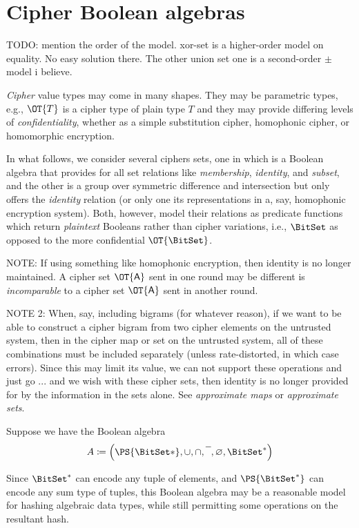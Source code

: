\documentclass[ ../main.tex]{subfiles}
\begin{document}
\section{Cipher Boolean algebras}
TODO: mention the order of the model. xor-set is a higher-order model on equality. No easy solution there.
The other union set one is a second-order $\pm$ model i believe.

\emph{Cipher} value types may come in many shapes.
They may be parametric types, e.g., $\OT{T}$ is a cipher type of plain type $T$ and they may provide differing levels of \emph{confidentiality}, whether as a simple substitution cipher, homophonic cipher, or homomorphic encryption.

In what follows, we consider several ciphers sets, one in which is a Boolean algebra that provides for all set relations like \emph{membership}, \emph{identity}, and \emph{subset}, and the other is a group over symmetric difference and intersection but only offers the \emph{identity} relation (or only one its representations in a, say, homophonic encryption system).
Both, however, model their relations as predicate functions which return \emph{plaintext} Booleans rather than cipher variations, i.e., $\BitSet$ as opposed to the more confidential $\OT{\BitSet}$.

NOTE: If using something like homophonic encryption, then identity is no longer maintained. A cipher set $\OT{\Set{A}}$ sent in one round may be different is \emph{incomparable} to a cipher set $\OT{\Set{A}}$ sent in another round. 

NOTE 2: When, say, including bigrams (for whatever reason), if we want to be able to construct a cipher bigram from two cipher elements on the untrusted system, then in the cipher map or set on the untrusted system, all of these combinations must be included separately (unless rate-distorted, in which case errors). Since this may limit its value, we can not support these operations and just go 
...
and we wish  with these cipher sets, then identity is no longer provided for by the information in the sets alone. See \emph{approximate maps} or \emph{approximate sets}.




Suppose we have the Boolean algebra
\begin{equation}
	A \coloneqq \left(\PS{\BitSet*}, \SetUnion, \SetIntersection, \SetComplement, \EmptySet, {\BitSet^*}\right)
\end{equation}

Since $\BitSet^*$ can encode any tuple of elements, and $\PS{\BitSet^*}$ can encode any sum type of tuples, this Boolean algebra may be a reasonable model for hashing algebraic data types, while still permitting some operations on the resultant hash.
\end{document}
